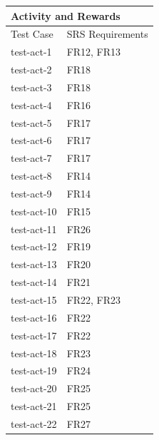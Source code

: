 \documentclass[12pt, titlepage]{article}
\begin{document}
\begin{center}
\begin{tabular}{p{} p{}}
\hline
\multicolumn{2}{l}{Activity and Rewards} \\
\hline
Test Case & SRS Requirements \\
\hline
test-act-1 & FR12, FR13 \\
test-act-2 & FR18 \\
test-act-3 & FR18 \\
test-act-4 & FR16 \\
test-act-5 & FR17 \\
test-act-6 & FR17 \\
test-act-7 & FR17 \\
test-act-8 & FR14 \\
test-act-9 & FR14 \\
test-act-10 & FR15 \\
test-act-11 & FR26 \\
test-act-12 & FR19 \\
test-act-13 & FR20 \\
test-act-14 & FR21 \\
test-act-15 & FR22, FR23 \\
test-act-16 & FR22 \\
test-act-17 & FR22 \\
test-act-18 & FR23 \\
test-act-19 & FR24 \\
test-act-20 & FR25 \\
test-act-21 & FR25 \\
test-act-22 & FR27 \\
\hline
\end{tabular}
\end{center}
\end{document}
